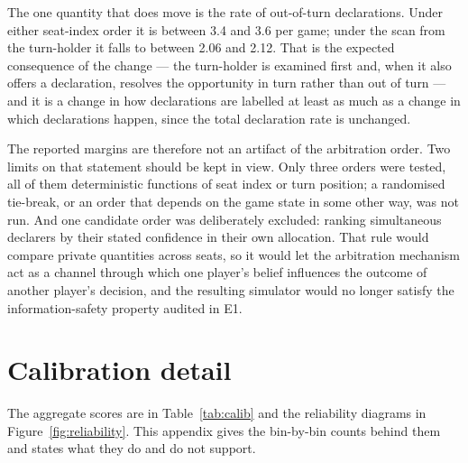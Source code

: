\documentclass[11pt]{article}
\theoremstyle{definition}
\newcommand{\numArbOOTSeatLo}{3.4}
\newcommand{\numArbOOTSeatHi}{3.6}
\newcommand{\numArbOOTTurnLo}{2.06}
\newcommand{\numArbOOTTurnHi}{2.12}
\begin{document}
The one quantity that does move is the rate of out-of-turn declarations. Under
either seat-index order it is between \numArbOOTSeatLo{} and
\numArbOOTSeatHi{} per game; under the scan from the turn-holder it falls to
between \numArbOOTTurnLo{} and \numArbOOTTurnHi{}. That is the expected
consequence of the change --- the turn-holder is examined first and, when it
also offers a declaration, resolves the opportunity in turn rather than out of
turn --- and it is a change in how declarations are labelled at least as much as
a change in which declarations happen, since the total declaration rate is
unchanged.

The reported margins are therefore not an artifact of the arbitration order.
Two limits on that statement should be kept in view. Only three orders were
tested, all of them deterministic functions of seat index or turn position; a
randomised tie-break, or an order that depends on the game state in some other
way, was not run. And one candidate order was deliberately excluded: ranking
simultaneous declarers by their stated confidence in their own allocation. That
rule would compare private quantities across seats, so it would let the
arbitration mechanism act as a channel through which one player's belief
influences the outcome of another player's decision, and the resulting simulator
would no longer satisfy the information-safety property audited in E1.
\section{Calibration detail}
\label{app:calibration}

The aggregate scores are in Table~\ref{tab:calib} and the reliability diagrams in
Figure~\ref{fig:reliability}. This appendix gives the bin-by-bin counts behind
them and states what they do and do not support.
\end{document}
